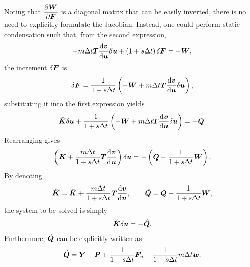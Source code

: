 Noting that $\dfrac{\partial{\bm{W}}}{\partial{\bm{F}}}$ is a diagonal matrix that can be easily inverted, there is no need to explicitly formulate the Jacobian. Instead, one could perform static condensation such that, from the second expression,
\begin{gather}
-m\Delta{}t\bm{T}\dfrac{\mathrm{d}\bm{v}}{\mathrm{d}\bm{u}}\delta\bm{u}+\left(1+s\Delta{}t\right)\delta\bm{F}=-\bm{W},
\end{gather}
the increment $\delta\bm{F}$ is
\begin{gather}
\delta\bm{F}=\dfrac{1}{1+s\Delta{}t}\left(-\bm{W}+m\Delta{}t\bm{T}\dfrac{\mathrm{d}\bm{v}}{\mathrm{d}\bm{u}}\delta\bm{u}\right),
\end{gather}
substituting it into the first expression yields
\begin{gather}
\bar{\bm{K}}\delta\bm{u}+\dfrac{1}{1+s\Delta{}t}\left(-\bm{W}+m\Delta{}t\bm{T}\dfrac{\mathrm{d}\bm{v}}{\mathrm{d}\bm{u}}\delta\bm{u}\right)=-\bm{Q}.
\end{gather}
Rearranging gives
\begin{gather}
\left(\bar{\bm{K}}+\dfrac{m\Delta{}t}{1+s\Delta{}t}\bm{T}\dfrac{\mathrm{d}\bm{v}}{\mathrm{d}\bm{u}}\right)\delta\bm{u}=-\left(\bm{Q}-\dfrac{1}{1+s\Delta{}t}\bm{W}\right).
\end{gather}
By denoting
\begin{gather}
\hat{\bm{K}}=\bar{\bm{K}}+\dfrac{m\Delta{}t}{1+s\Delta{}t}\bm{T}\dfrac{\mathrm{d}\bm{v}}{\mathrm{d}\bm{u}},\qquad
\hat{\bm{Q}}=\bm{Q}-\dfrac{1}{1+s\Delta{}t}\bm{W},
\end{gather}
the system to be solved is simply
\begin{gather}
\hat{\bm{K}}\delta\bm{u}=-\hat{\bm{Q}}.
\end{gather}
Furthermore, $\hat{\bm{Q}}$ can be explicitly written as
\begin{gather}
\hat{\bm{Q}}=\bm{Y}-\bm{P}+\dfrac{1}{1+s\Delta{}t}\bm{F}_n+\dfrac{1}{1+s\Delta{}t}m\Delta{}t\bm{w}.
\end{gather}